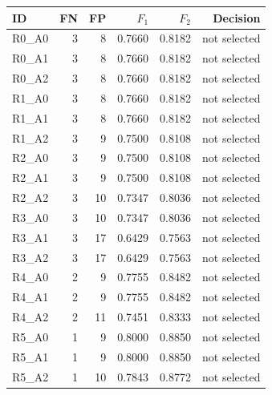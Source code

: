 \begin{tabular}{lrrrrr}
\toprule
ID & FN & FP & $F_1$ & $F_2$ & Decision \\
\midrule
R0\_A0 & 3 & 8 & 0.7660 & 0.8182 & not selected \\
R0\_A1 & 3 & 8 & 0.7660 & 0.8182 & not selected \\
R0\_A2 & 3 & 8 & 0.7660 & 0.8182 & not selected \\
R1\_A0 & 3 & 8 & 0.7660 & 0.8182 & not selected \\
R1\_A1 & 3 & 8 & 0.7660 & 0.8182 & not selected \\
R1\_A2 & 3 & 9 & 0.7500 & 0.8108 & not selected \\
R2\_A0 & 3 & 9 & 0.7500 & 0.8108 & not selected \\
R2\_A1 & 3 & 9 & 0.7500 & 0.8108 & not selected \\
R2\_A2 & 3 & 10 & 0.7347 & 0.8036 & not selected \\
R3\_A0 & 3 & 10 & 0.7347 & 0.8036 & not selected \\
R3\_A1 & 3 & 17 & 0.6429 & 0.7563 & not selected \\
R3\_A2 & 3 & 17 & 0.6429 & 0.7563 & not selected \\
R4\_A0 & 2 & 9 & 0.7755 & 0.8482 & not selected \\
R4\_A1 & 2 & 9 & 0.7755 & 0.8482 & not selected \\
R4\_A2 & 2 & 11 & 0.7451 & 0.8333 & not selected \\
R5\_A0 & 1 & 9 & 0.8000 & 0.8850 & not selected \\
R5\_A1 & 1 & 9 & 0.8000 & 0.8850 & not selected \\
R5\_A2 & 1 & 10 & 0.7843 & 0.8772 & not selected \\
\bottomrule
\end{tabular}
